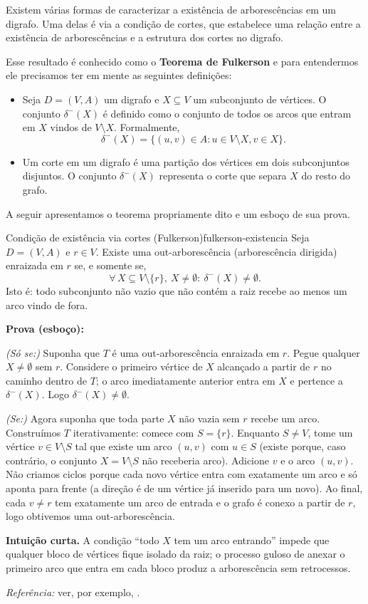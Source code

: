 Existem várias formas de caracterizar a existência de arborescências em um digrafo. Uma delas é via a condição de cortes, que estabelece uma relação entre a existência de arborescências e a estrutura dos cortes no digrafo.


Esse resultado é conhecido como o \textbf{Teorema de Fulkerson} e para entendermos ele precisamos ter em mente as seguintes definições:

\begin{itemize}
	\item Seja \(D = (V, A)\) um digrafo e \(X \subseteq V\) um subconjunto de vértices. O conjunto \(\delta^-(X)\) é definido como o conjunto de todos os arcos que entram em \(X\) vindos de \(V \setminus X\). Formalmente,
	      \[
		      \delta^-(X) = \{(u, v) \in A : u \in V \setminus X, v \in X\}.
	      \]
	\item Um corte em um digrafo é uma partição dos vértices em dois subconjuntos disjuntos. O conjunto \(\delta^-(X)\) representa o corte que separa \(X\) do resto do grafo.
\end{itemize}


A seguir apresentamos o teorema propriamente dito e um esboço de sua prova.


\begin{teobox}{Condição de existência via cortes (Fulkerson)}{fulkerson-existencia}
	Seja $D=(V,A)$ e $r\in V$. Existe uma out-arborescência (arborescência dirigida) enraizada em $r$ se, e somente se,
	\[
		\forall\, X\subseteq V\setminus\{r\},\ X\neq\emptyset:\  \delta^-(X)\neq\emptyset.
	\]
	Isto é: todo subconjunto não vazio que não contém a raiz recebe ao menos um arco vindo de fora.


	\textbf{Prova (esboço):}


	\emph{(Só se:)} Suponha que $T$ é uma out-arborescência enraizada em $r$. Pegue qualquer $X\neq\emptyset$ sem $r$. Considere o primeiro vértice de $X$ alcançado a partir de $r$ no caminho dentro de $T$; o arco imediatamente anterior entra em $X$ e pertence a $\delta^-(X)$. Logo $\delta^-(X)\neq\emptyset$.


	\emph{(Se:)} Agora suponha que toda parte $X$ não vazia sem $r$ recebe um arco. Construímos $T$ iterativamente: comece com $S=\{r\}$. Enquanto $S\neq V$, tome um vértice $v\in V\setminus S$ tal que existe um arco $(u,v)$ com $u\in S$ (existe porque, caso contrário, o conjunto $X=V\setminus S$ não receberia arco). Adicione $v$ e o arco $(u,v)$. Não criamos ciclos porque cada novo vértice entra com exatamente um arco e só aponta para frente (a direção é de um vértice já inserido para um novo). Ao final, cada $v\neq r$ tem exatamente um arco de entrada e o grafo é conexo a partir de $r$, logo obtivemos uma out-arborescência.

	\medskip
	\textbf{Intuição curta.} A condição “todo $X$ tem um arco entrando” impede que qualquer bloco de vértices fique isolado da raiz; o processo guloso de anexar o primeiro arco que entra em cada bloco produz a arborescência sem retrocessos.

	\medskip
	\emph{Referência:} ver, por exemplo, \cite{schrijver2003comb}.
	\label{thm:fulkerson-cut-arborescencia}
\end{teobox}


